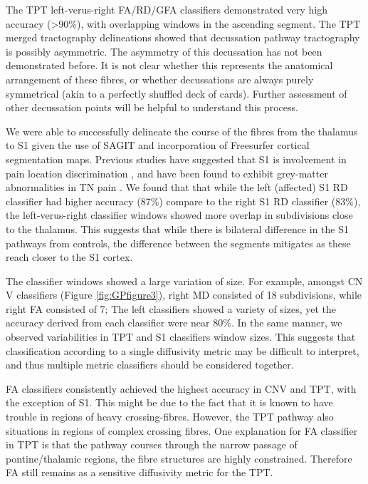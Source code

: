 The TPT left-verus-right FA/RD/GFA classifiers demonstrated very high accuracy (\textgreater 90\%), with overlapping windows in the ascending segment. The TPT merged tractography delineations showed that decussation pathway tractography is possibly asymmetric. The asymmetry of this decussation has not been demonstrated before. It is not clear whether this represents the anatomical arrangement of these fibres, or whether decussations are always purely symmetrical (akin to a perfectly shuffled deck of cards). Further assessment of other decussation points will be helpful to understand this process.  

We were able to successfully delineate the course of the fibres from the thalamus to S1 given the use of SAGIT and incorporation of Freesurfer cortical segmentation maps. Previous studies have suggested that S1 is involvement in pain location discrimination \cite{bushnell1999pain}, and have been found to exhibit grey-matter abnormalities in TN pain \cite{Desouza2013c}. We found that that while the left (affected) S1 RD classifier had higher accuracy (87\%) compare to the right S1 RD classifier (83\%), the left-verus-right classifier windows showed more overlap in subdivisions close to the thalamus. This suggests that while there is bilateral difference in the S1 pathways from controls, the difference between the segments mitigates as these reach closer to the S1 cortex.


The classifier windows showed a large variation of size. For example, amongst CN V classifiers (Figure \ref{fig:GPfigure3}), right MD consisted of 18 subdivisions, while right FA consisted of 7; The left classifiers showed a variety of sizes, yet the accuracy derived from each classifier were near 80\%. In the same manner, we observed variabilities in TPT and S1 classifiers window sizes. This suggests that classification according to a single diffusivity metric may be difficult to interpret, and thus multiple metric classifiers should be considered together. 

FA classifiers consistently achieved the highest accuracy in CNV and TPT, with the exception of S1. This might be due to the fact that it is known to have trouble in regions of heavy crossing-fibres. However, the TPT pathway also situations in regions of complex crossing fibres. One explanation for FA classifier in TPT is that the pathway courses through the narrow passage of pontine/thalamic regions, the fibre structures are highly constrained. Therefore FA still remains as a sensitive diffusivity metric for the TPT. 

